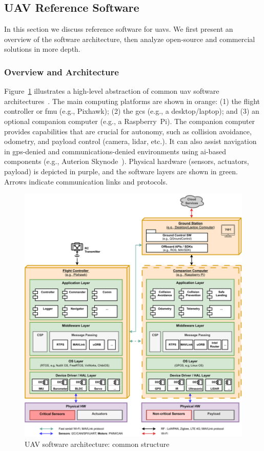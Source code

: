\subsection{UAV Reference Software}%
\label{sec:uav-ref-sw}
In this section we discuss reference software for \glspl{uav}. 
We first present an overview of the software architecture, then analyze open-source and commercial solutions in more depth.

\subsubsection{Overview and Architecture}%
\label{sec:overv-arch-sw}
Figure~\ref{fig:uav-sw-arch} illustrates a high-level abstraction of common \gls{uav} software architectures~\cite{leccadito2018survey,px4-sysArch}.
The main computing platforms are shown in orange: 
(1) the flight controller or \gls{fmu} (e.g., Pixhawk); 
(2) the \gls{gcs} (e.g., a desktop/laptop); and 
(3) an optional companion computer (e.g., a Raspberry~Pi). 
The companion computer provides capabilities that are crucial for autonomy, such as collision avoidance, odometry, and payload control (camera, \gls{lidar}, etc.). 
It can also assist navigation in \gls{gps}-denied and communications-denied environments using \gls{ai}-based components (e.g., Auterion Skynode~\cite{skynodeS-noJamming}). 
Physical hardware (sensors, actuators, payload) is depicted in purple, and the software layers are shown in green. 
Arrows indicate communication links and protocols.

\begin{figure}[!hbtp]
  \centering
  \includegraphics[width=\textwidth]{./img/pdf/uav-sw-arch.pdf}
  \caption{UAV software architecture: common structure}
  \label{fig:uav-sw-arch}
\end{figure}

